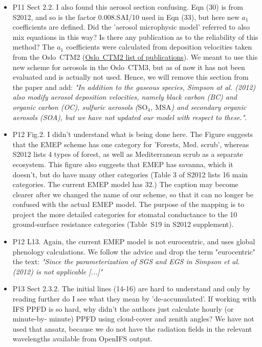 \begin{itemize}
\item {\color{blue}P11 Sect 2.2. I also found this aerosol section confusing. Eqn (30) is from S2012,
and so is the factor 0.008.SAI/10 used in Eqn (33), but here new $a_1$ coefficients
are defined. Did the ’aerosol microphysic model’ referred to also mix equations
in this way? Is there any publication as to the reliability of this method?}
  The $a_1$ coefficients were calculated from deposition velocities taken from the Oslo~CTM2 (\href{http://folk.uio.no/mariantl/osloctm3/history.html}{Oslo~CTM2 list of publications}). We meant to use this new scheme for aerosols in the Oslo~CTM3, but as of now it has not been evaluated and is actually not used. Hence, we will remove this section from the paper and add: \emph{"In addition to the gaseous species, Simpson at al. (2012) also modify aerosol deposition velocities, namely black carbon (BC) and organic carbon (OC), sulfuric aerosols ($\mathrm{SO_4}$, $\mathrm{MSA}$) and secondary organic aerosols (SOA), but we have not updated our model with respect to these."}.
  
\item {\color{blue}P12 Fig.2. I didn’t understand what is being done here. The Figure suggests that
the EMEP scheme has one category for ’Forests, Med. scrub’, whereas S2012
lists 4 types of forest, as well as Mediterranean scrub as a separate ecosystem.
This figure also suggests that EMEP has savanna, which it doesn’t, but do have
many other categories (Table 3 of S2012 lists 16 main categories. The current
EMEP model has 32.)}
  The caption may become clearer after we changed the name of our scheme, so that it can no longer be confused with the actual EMEP model. The purpose of the mapping is to project the more detailed categories for stomatal conductance to the 10 ground-surface resistance categories (Table~S19 in S2012 supplement).
  
\item {\color{blue}P12 L13. Again, the current EMEP model is not eurocentric, and uses global
  phenology calculations.}
  We follow the advice and drop the term "eurocentric" the text: \emph{"Since the parameterization of SGS and EGS in Simpson et al. (2012) is not applicable [...]"}
  
\item {\color{blue}P13 Sect 2.3.2. The initial lines (14-16) are hard to understand and only by
reading further do I see what they mean by ’de-accumulated’. If working with
IFS PPFD is so hard, why didn’t the authors just calculate hourly (or minute-by-
minute) PPFD using cloud-cover and zenith angles?}
We have not used that ansatz, because we do not have the radiation fields in the relevant wavelengths available from OpenIFS output.
\end{itemize}

%
